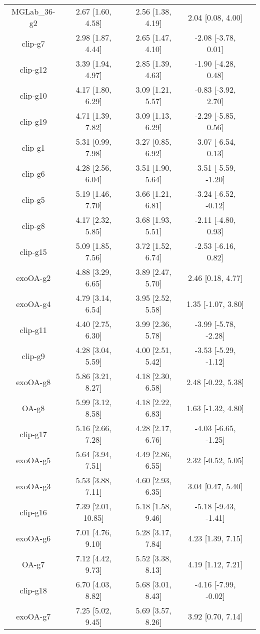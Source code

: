 \documentclass[8pt]{article}
\begin{document}
\begin{center}
\begin{footnotesize}
\begin{longtable}{|ccccc|}
 MGLab\_36-g2 &   2.67 [1.60, 4.58] &  2.56 [1.38, 4.19] &     2.04 [0.08, 4.00] \\
      clip-g7 &   2.98 [1.87, 4.44] &  2.65 [1.47, 4.10] &   -2.08 [-3.78, 0.01] \\
     clip-g12 &   3.39 [1.94, 4.97] &  2.85 [1.39, 4.63] &   -1.90 [-4.28, 0.48] \\
     clip-g10 &   4.17 [1.80, 6.29] &  3.09 [1.21, 5.57] &   -0.83 [-3.92, 2.70] \\
     clip-g19 &   4.71 [1.39, 7.82] &  3.09 [1.13, 6.29] &   -2.29 [-5.85, 0.56] \\
      clip-g1 &   5.31 [0.99, 7.98] &  3.27 [0.85, 6.92] &   -3.07 [-6.54, 0.13] \\
      clip-g6 &   4.28 [2.56, 6.04] &  3.51 [1.90, 5.64] &  -3.51 [-5.59, -1.20] \\
      clip-g5 &   5.19 [1.46, 7.70] &  3.66 [1.21, 6.81] &  -3.24 [-6.52, -0.12] \\
      clip-g8 &   4.17 [2.32, 5.85] &  3.68 [1.93, 5.51] &   -2.11 [-4.80, 0.93] \\
     clip-g15 &   5.09 [1.85, 7.56] &  3.72 [1.52, 6.74] &   -2.53 [-6.16, 0.82] \\
     exoOA-g2 &   4.88 [3.29, 6.65] &  3.89 [2.47, 5.70] &     2.46 [0.18, 4.77] \\
     exoOA-g4 &   4.79 [3.14, 6.54] &  3.95 [2.52, 5.58] &    1.35 [-1.07, 3.80] \\
     clip-g11 &   4.40 [2.75, 6.30] &  3.99 [2.36, 5.78] &  -3.99 [-5.78, -2.28] \\
      clip-g9 &   4.28 [3.04, 5.59] &  4.00 [2.51, 5.42] &  -3.53 [-5.29, -1.12] \\
     exoOA-g8 &   5.86 [3.21, 8.27] &  4.18 [2.30, 6.58] &    2.48 [-0.22, 5.38] \\
        OA-g8 &   5.99 [3.12, 8.58] &  4.18 [2.22, 6.83] &    1.63 [-1.32, 4.80] \\
     clip-g17 &   5.16 [2.66, 7.28] &  4.28 [2.17, 6.76] &  -4.03 [-6.65, -1.25] \\
     exoOA-g5 &   5.64 [3.94, 7.51] &  4.49 [2.86, 6.55] &    2.32 [-0.52, 5.05] \\
     exoOA-g3 &   5.53 [3.88, 7.11] &  4.60 [2.93, 6.35] &     3.04 [0.47, 5.40] \\
     clip-g16 &  7.39 [2.01, 10.85] &  5.18 [1.58, 9.46] &  -5.18 [-9.43, -1.41] \\
     exoOA-g6 &   7.01 [4.76, 9.10] &  5.28 [3.17, 7.84] &     4.23 [1.39, 7.15] \\
        OA-g7 &   7.12 [4.42, 9.73] &  5.52 [3.38, 8.13] &     4.19 [1.12, 7.21] \\
     clip-g18 &   6.70 [4.03, 8.82] &  5.68 [3.01, 8.43] &  -4.16 [-7.99, -0.02] \\
     exoOA-g7 &   7.25 [5.02, 9.45] &  5.69 [3.57, 8.26] &     3.92 [0.70, 7.14] \\
\end{longtable}
\end{footnotesize}
\end{center}
\end{document}
